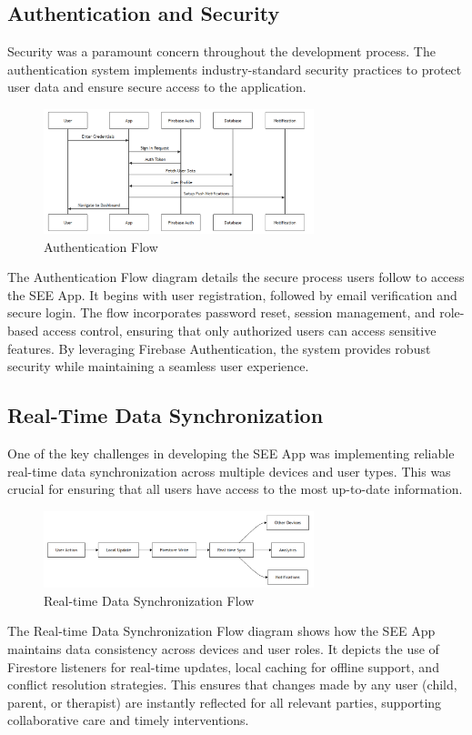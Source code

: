 \documentclass[12pt,a4paper]{article}
\newcommand{\sectiontitle}[1]{\subsection{#1}}
\begin{document}
\sectiontitle{Authentication and Security}

Security was a paramount concern throughout the development process. The authentication system implements industry-standard security practices to protect user data and ensure secure access to the application.

\begin{figure}[H]
    \centering
    \includegraphics[width=0.7\textwidth,height=0.32\textwidth,keepaspectratio]{redrawn_diagrams/Figure2_Authentication_Flow.png}
    \caption{Authentication Flow}
    \label{fig:auth-flow}
\end{figure}
\vspace{0.5em}
The Authentication Flow diagram details the secure process users follow to access the SEE App. It begins with user registration, followed by email verification and secure login. The flow incorporates password reset, session management, and role-based access control, ensuring that only authorized users can access sensitive features. By leveraging Firebase Authentication, the system provides robust security while maintaining a seamless user experience.

\sectiontitle{Real-Time Data Synchronization}

One of the key challenges in developing the SEE App was implementing reliable real-time data synchronization across multiple devices and user types. This was crucial for ensuring that all users have access to the most up-to-date information.

\begin{figure}[H]
    \centering
    \includegraphics[width=0.7\textwidth,height=0.2\textwidth,keepaspectratio]{redrawn_diagrams/Figure3_Real_time_Data_Sync.png}
    \caption{Real-time Data Synchronization Flow}
    \label{fig:data-sync}
\end{figure}
\vspace{0.5em}
The Real-time Data Synchronization Flow diagram shows how the SEE App maintains data consistency across devices and user roles. It depicts the use of Firestore listeners for real-time updates, local caching for offline support, and conflict resolution strategies. This ensures that changes made by any user (child, parent, or therapist) are instantly reflected for all relevant parties, supporting collaborative care and timely interventions.
\end{document}
